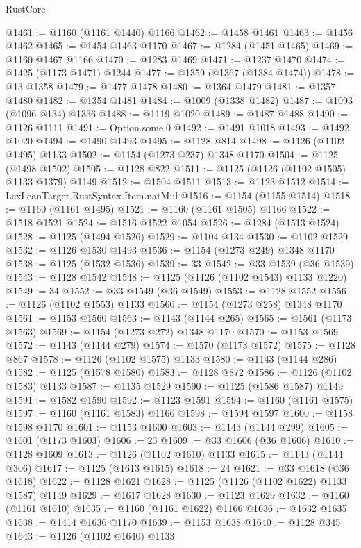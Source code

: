 \begin{lexlean}{RustCore}
\begin{coremodule}
@1461 := @1160 (@1161 @1440) @1166
@1462 := @1458 @1461
@1463 := @1456 @1462
@1465 := @1454 @1463 @1170
@1467 := @1284 (@1451 @1465)
@1469 := @1160 @1467 @1166
@1470 := @1283 @1469
@1471 := @1237 @1470
@1474 := @1425 (@1173 @1471) @1244
@1477 := @1359 (@1367 (@1384 @1474))
@1478 := @13 @1358
@1479 := @1477 @1478
@1480 := @1364 @1479
@1481 := @1357 @1480
@1482 := @1354 @1481
@1484 := @1009 (@1338 @1482)
@1487 := @1093 (@1096 @134) @1336
@1488 := @1119 @1020
@1489 := @1487 @1488
@1490 := @1126 @1111
@1491 := Option.some.{0}
@1492 := @1491 @1018
@1493 := @1492 @1020
@1494 := @1490 @1493
@1495 := @1128 @814
@1498 := @1126 (@1102 @1495) @1133
@1502 := @1154 (@1273 @237) @1348 @1170
@1504 := @1125 (@1498 @1502)
@1505 := @1128 @822
@1511 := @1125 (@1126 (@1102 @1505) @1133 @1379) @1149
@1512 := @1504 @1511
@1513 := @1123 @1512
@1514 := LexLeanTarget.RustSyntax.Item.natMul
@1516 := @1154 (@1155 @1514)
@1518 := @1160 (@1161 @1495)
@1521 := @1160 (@1161 @1505) @1166
@1522 := @1518 @1521
@1524 := @1516 @1522 @1054
@1526 := @1284 (@1513 @1524)
@1528 := @1125 (@1494 @1526)
@1529 := @1104 @134
@1530 := @1102 @1529
@1532 := @1126 @1530 @1493
@1536 := @1154 (@1273 @249) @1348 @1170
@1538 := @1125 (@1532 @1536)
@1539 := 33
@1542 := @33 @1539 (@36 @1539)
@1543 := @1128 @1542
@1548 := @1125 (@1126 (@1102 @1543) @1133 @1220)
@1549 := 34
@1552 := @33 @1549 (@36 @1549)
@1553 := @1128 @1552
@1556 := @1126 (@1102 @1553) @1133
@1560 := @1154 (@1273 @258) @1348 @1170
@1561 := @1153 @1560
@1563 := @1143 (@1144 @265)
@1565 := @1561 (@1173 @1563)
@1569 := @1154 (@1273 @272) @1348 @1170
@1570 := @1153 @1569
@1572 := @1143 (@1144 @279)
@1574 := @1570 (@1173 @1572)
@1575 := @1128 @867
@1578 := @1126 (@1102 @1575) @1133
@1580 := @1143 (@1144 @286)
@1582 := @1125 (@1578 @1580)
@1583 := @1128 @872
@1586 := @1126 (@1102 @1583) @1133
@1587 := @1135 @1529
@1590 := @1125 (@1586 @1587) @1149
@1591 := @1582 @1590
@1592 := @1123 @1591
@1594 := @1160 (@1161 @1575)
@1597 := @1160 (@1161 @1583) @1166
@1598 := @1594 @1597
@1600 := @1158 @1598 @1170
@1601 := @1153 @1600
@1603 := @1143 (@1144 @299)
@1605 := @1601 (@1173 @1603)
@1606 := 23
@1609 := @33 @1606 (@36 @1606)
@1610 := @1128 @1609
@1613 := @1126 (@1102 @1610) @1133
@1615 := @1143 (@1144 @306)
@1617 := @1125 (@1613 @1615)
@1618 := 24
@1621 := @33 @1618 (@36 @1618)
@1622 := @1128 @1621
@1628 := @1125 (@1126 (@1102 @1622) @1133 @1587) @1149
@1629 := @1617 @1628
@1630 := @1123 @1629
@1632 := @1160 (@1161 @1610)
@1635 := @1160 (@1161 @1622) @1166
@1636 := @1632 @1635
@1638 := @1414 @1636 @1170
@1639 := @1153 @1638
@1640 := @1128 @345
@1643 := @1126 (@1102 @1640) @1133

\end{coremodule}
\end{lexlean}
